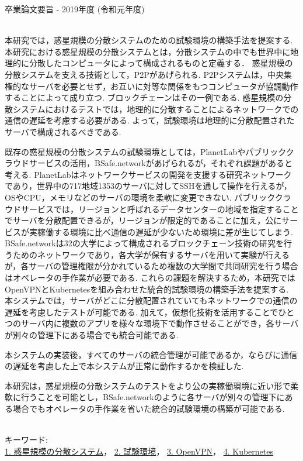 卒業論文要旨 - 2019年度 (令和元年度)
\begin{center}
\begin{large}
\end{large}
\end{center}

~ \\
本研究では，惑星規模の分散システムのための試験環境の構築手法を提案する.
本研究における惑星規模の分散システムとは，分散システムの中でも世界中に地理的に分散したコンピュータによって構成されるものと定義する．
惑星規模の分散システムを支える技術として，P2Pがあげられる.
P2Pシステムは，中央集権的なサーバを必要とせず，お互いに対等な関係をもつコンピュータが協調動作することによって成り立つ.
ブロックチェーンはその一例である.
惑星規模の分散システムにおけるテストでは，地理的に分散することによるネットワークでの通信の遅延を考慮する必要がある.
よって，試験環境は地理的に分散配置されたサーバで構成されるべきである.

既存の惑星規模の分散システムの試験環境としては，PlanetLabやパブリッククラウドサービスの活用，BSafe.networkがあげられるが，それぞれ課題があると考える.
PlanetLabはネットワークサービスの開発を支援する研究ネットワークであり，世界中の717地域1353のサーバに対してSSHを通して操作を行えるが，OSやCPU，メモリなどのサーバの環境を柔軟に変更できない.
パブリッククラウドサービスでは，リージョンと呼ばれるデータセンターの地域を指定することでサーバを分散配置できるが，リージョンが限定的であることに加え，公にサービスが実稼働する環境に比べ通信の遅延が少ないため環境に差が生じてしまう.
BSafe.networkは32の大学によって構成されるブロックチェーン技術の研究を行うためのネットワークであり，各大学が保有するサーバを用いて実験が行えるが，各サーバの管理権限が分かれているため複数の大学間で共同研究を行う場合はオペレータの手作業が必要である.
これらの課題を解決するため，本研究ではOpenVPNとKubernetesを組み合わせた統合的試験環境の構築手法を提案する.
本システムでは，サーバがどこに分散配置されていてもネットワークでの通信の遅延を考慮したテストが可能である.
加えて，仮想化技術を活用することでひとつのサーバ内に複数のアプリを様々な環境下で動作させることができ，各サーバが別々の管理下にある場合でも統合可能である.

本システムの実装後，すべてのサーバの統合管理が可能であるか，ならびに通信の遅延を考慮した上で本システムが正常に動作するかを検証した.

本研究は，惑星規模の分散システムのテストをより公の実稼働環境に近い形で柔軟に行うことを可能とし，BSafe.networkのように各サーバが別々の管理下にある場合でもオペレータの手作業を省いた統合的試験環境の構築が可能である.

~ \\
キーワード:\\
\underline{1. 惑星規模の分散システム}，
\underline{2. 試験環境}，
\underline{3. OpenVPN}，
\underline{4. Kubernetes}

\begin{flushright}
\dept \\
\author
\end{flushright}
